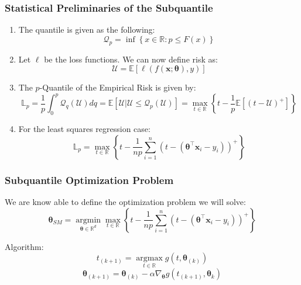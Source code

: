 \documentclass[
11pt, %
serif
]{beamer}
\begin{document}
	\begin{frame}
		\frametitle{Statistical Preliminaries of the Subquantile}
		\begin{enumerate}
			\item 
			The quantile is given as the following:
			\begin{equation*}
				\mathcal{Q}_p = \inf\left\{x \in \mathbb{R}: p \leq F(x)\right\}
			\end{equation*}
			\item 
			Let $\ell$ be the loss functions. We can now define risk as:
			\begin{equation*}
				\mathcal{U} = \mathbb{E}\left[\ell(f(\boldsymbol{x};\boldsymbol{\theta}),y)\right]
			\end{equation*}
			\item 
			The $p$-Quantile of the Empirical Risk is given by:
			\begin{equation*}
				\mathbb{L}_p = \frac{1}{p}\int_0^p \mathcal{Q}_q(\mathcal{U})dq = \mathbb{E}\left[\mathcal{U}|\mathcal{U} \leq \mathcal{Q}_p (\mathcal{U})\right] = \max_{t \in \mathbb{R}}\left\{t - \frac{1}{p}\mathbb{E}\left[(t-\mathcal{U})^+\right]\right\}
			\end{equation*}
			\item 
			For the least squares regression case:
			\begin{equation*}
				\mathbb{L}_p = \max_{t\in\mathbb{R}}\left\{t - \frac{1}{np}\sum_{i=1}^n\left(t - \left(\boldsymbol{\theta}^\top\boldsymbol{x}_i - y_i\right)\right)^+\right\}
			\end{equation*}
		\end{enumerate}
	\end{frame}
	
	
	\begin{frame}
		\frametitle{Subquantile Optimization Problem}
		We are know able to define the optimization problem we will solve:
		\begin{equation*}
			\boldsymbol{\theta}_{SM} = \operatorname*{argmin}_{\boldsymbol{\theta} \in \mathbb{R}^d}\max_{t\in\mathbb{R}}\left\{t - \frac{1}{np}\sum_{i=1}^n\left(t - \left(\boldsymbol{\theta}^\top\boldsymbol{x}_i - y_i\right)\right)^+\right\}
		\end{equation*}
		
		Algorithm:
		\begin{equation*}
			t_{(k+1)} = \operatorname*{argmax}_{t \in \mathbb{R}}g(t,\boldsymbol{\theta}_{(k)})
		\end{equation*}
		\begin{equation*}
			\boldsymbol{\theta}_{(k+1)} = \boldsymbol{\theta}_{(k)} - \alpha \nabla_{\boldsymbol{\theta}}g(t_{(k+1)}, \boldsymbol{\theta}_k)
		\end{equation*}
		
	\end{frame}
	
\end{document}
